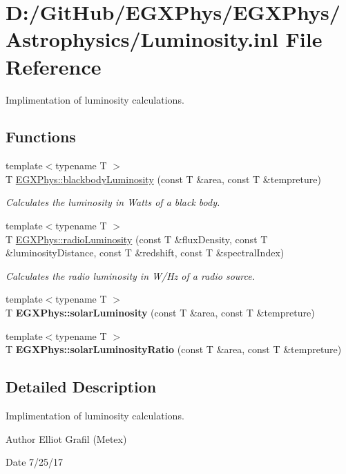 \hypertarget{_luminosity_8inl}{}\section{D\+:/\+Git\+Hub/\+E\+G\+X\+Phys/\+E\+G\+X\+Phys/\+Astrophysics/\+Luminosity.inl File Reference}
\label{_luminosity_8inl}


Implimentation of luminosity calculations.  


\subsection*{Functions}
\begin{DoxyCompactItemize}
\item 
{\footnotesize template$<$typename T $>$ }\\T \mbox{\hyperlink{group___e_g_x_phys-_luminosity_ga909f82edfaed449b44e94788b642ebb8}{E\+G\+X\+Phys\+::blackbody\+Luminosity}} (const T \&area, const T \&tempreture)
\begin{DoxyCompactList}\small\item\em Calculates the luminosity in Watts of a black body. \end{DoxyCompactList}\item 
{\footnotesize template$<$typename T $>$ }\\T \mbox{\hyperlink{group___e_g_x_phys-_luminosity_ga6d6865b2aac1bc7c7f06b7c4ac2444e4}{E\+G\+X\+Phys\+::radio\+Luminosity}} (const T \&flux\+Density, const T \&luminosity\+Distance, const T \&redshift, const T \&spectral\+Index)
\begin{DoxyCompactList}\small\item\em Calculates the radio luminosity in W/\+Hz of a radio source. \end{DoxyCompactList}\item 
\mbox{\label{_luminosity_8inl_ade3d05c9dcd810cb5290375d11587b6a}} 
{\footnotesize template$<$typename T $>$ }\\T {\bfseries E\+G\+X\+Phys\+::solar\+Luminosity} (const T \&area, const T \&tempreture)
\item 
\mbox{\label{_luminosity_8inl_ac5e66686d7910587e3636b7984d466e9}} 
{\footnotesize template$<$typename T $>$ }\\T {\bfseries E\+G\+X\+Phys\+::solar\+Luminosity\+Ratio} (const T \&area, const T \&tempreture)
\end{DoxyCompactItemize}


\subsection{Detailed Description}
Implimentation of luminosity calculations. 

\begin{DoxyAuthor}{Author}
Elliot Grafil (Metex) 
\end{DoxyAuthor}
\begin{DoxyDate}{Date}
7/25/17 
\end{DoxyDate}
